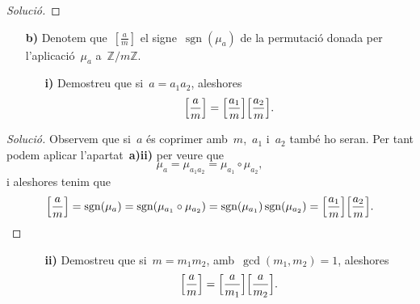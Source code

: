 \documentclass[a4paper]{article}
\newcommand{\ZZ}{\mathbb{Z}}
\DeclareMathOperator{\sgn}{sgn}
\newenvironment{solution}{
    \renewcommand\qedsymbol{\ensuremath{\lozenge}}
    \begin{proof}[Solució]
        }{
    \end{proof}
}
\begin{document}
\begin{solution}
\end{solution}

\begin{enumerate}
    \item[\textbf{b)}] Denotem que~\([\frac{a}{m}]\) el signe~\(\sgn(\mu_{a})\)
        de la permutació donada per l'aplicació~\(\mu_{a}\) a~\(\ZZ/m\ZZ\).
        \begin{enumerate}
            \item[\textbf{i)}] Demostreu que si~\(a=a_{1}a_{2}\), aleshores
                \[
                    \Bigl[\frac{a}{m}\Bigr]
                    =
                    \Bigl[\frac{a_{1}}{m}\Bigr]
                    \Bigl[\frac{a_{2}}{m}\Bigr].
                \]
        \end{enumerate}
\end{enumerate}

\begin{solution}
    Observem que si~\(a\) és coprimer amb~\(m\),~\(a_{1}\) i~\(a_{2}\) també ho
    seran. Per tant podem aplicar l'apartat~\textbf{a)ii)} per veure que
    \[
        \mu_{a} = \mu_{a_{1}a_{2}} = \mu_{a_{1}}\circ\mu_{a_{2}},
    \]
    i aleshores tenim que
    \[
        \Bigl[\frac{a}{m}\Bigr]
        = \sgn(\mu_{a})
        = \sgn(\mu_{a_{1}}\circ\mu_{a_{2}})
        = \sgn(\mu_{a_{1}})\sgn(\mu_{a_{2}})
        = \Bigl[\frac{a_{1}}{m}\Bigr]\Bigl[\frac{a_{2}}{m}\Bigr].
        \qedhere
    \]
\end{solution}

\begin{enumerate}
    \item[]\begin{enumerate}
        \item[\textbf{ii)}] Demostreu que si~\(m=m_{1}m_{2}\),
            amb~\(\gcd(m_{1},m_{2})=1\), aleshores
            \[
                \Bigl[\frac{a}{m}\Bigr]
                =
                \Bigl[\frac{a}{m_{1}}\Bigr]
                \Bigl[\frac{a}{m_{2}}\Bigr].
            \]
    \end{enumerate}
\end{enumerate}
\end{document}
